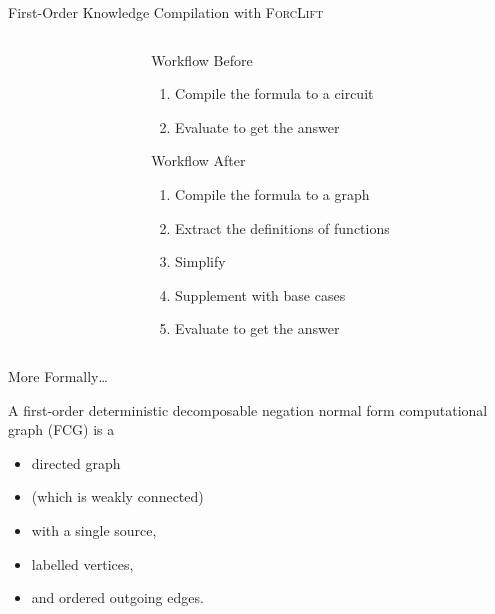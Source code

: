 \documentclass{beamer}
\begin{document}
\begin{frame}{First-Order Knowledge Compilation with \textsc{ForcLift}}
  \begin{columns}
    \begin{column}{0.25\textwidth}
      \centering
    \end{column}
    \begin{column}{0.75\textwidth}
      \begin{block}{Workflow Before}
        \begin{enumerate}
        \item Compile the formula to a \alert{circuit}
        \item Evaluate to get the answer
        \end{enumerate}
      \end{block}
      \pause
      \begin{block}{Workflow After}
        \begin{enumerate}
        \item Compile the formula to a \alert{graph}
        \item Extract the definitions of functions
        \item Simplify
        \item Supplement with \alert{base cases}
        \item Evaluate to get the answer
        \end{enumerate}
      \end{block}
    \end{column}
  \end{columns}
\end{frame}

\begin{frame}{More Formally\ldots}
  \begin{definition}
    A \alert{first-order deterministic decomposable negation normal form computational graph} (FCG) is a
    \begin{itemize}
    \item directed graph
    \item (which is weakly connected)
    \item with a single source,
    \item labelled vertices,
    \item and ordered outgoing edges.
    \end{itemize}
  \end{definition}
\end{frame}
\end{document}
